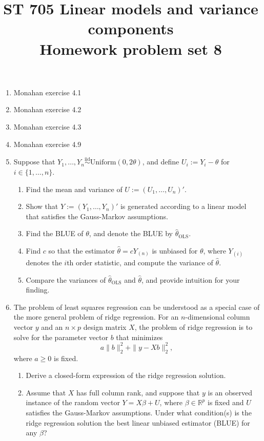 \documentclass[11pt]{article}
\title{ST 705 Linear models and variance components \\ 
        Homework problem set 8}
\begin{document}
\maketitle

\begin{enumerate}

\item Monahan exercise 4.1

\item Monahan exercise 4.2

\item Monahan exercise 4.3

\item Monahan exercise 4.9

\item Suppose that $Y_{1},\dots,Y_{n} \overset{\text{iid}}{\sim} \text{Uniform}(0,2\theta)$, and define $U_{i} := Y_{i} - \theta$ for $i \in \{1,\dots,n\}$.
\begin{enumerate}
\item Find the mean and variance of $U := (U_{1},\dots,U_{n})'$.
\item Show that $Y := (Y_{1},\dots,Y_{n})'$ is generated according to a linear model that satisfies the Gauss-Markov assumptions.
\item Find the BLUE of $\theta$, and denote the BLUE by $\hat{\theta}_{\text{OLS}}$.
\item Find $c$ so that the estimator $\hat{\theta} = cY_{(n)}$ is unbiased for $\theta$, where $Y_{(i)}$ denotes the $i$th order statistic, and compute the variance of $\hat{\theta}$.
\item Compare the variances of $\hat{\theta}_{\text{OLS}}$ and $\hat{\theta}$, and provide intuition for your finding.
\end{enumerate}

\item The problem of least squares regression can be understood as a special case of the more general problem of ridge regression.  For an $n$-dimensional column vector $y$ and an $n\times p$ design matrix $X$, the problem of ridge regression is to solve for the parameter vector $b$ that minimizes
\[
a\|b\|_{2}^{2} + \|y - Xb\|_{2}^{2},
\]
where $a \ge 0$ is fixed.
\begin{enumerate}
\item Derive a closed-form expression of the ridge regression solution.
\item Assume that $X$ has full column rank, and suppose that $y$ is an observed instance of the random vector $Y = X\beta + U$, where $\beta \in \mathbb{R}^{p}$ is fixed and $U$ satisfies the Gauss-Markov assumptions.  Under what condition(s) is the ridge regression solution the best linear unbiased estimator (BLUE) for any $\beta$?
\end{enumerate}

\end{enumerate}
\end{document}
